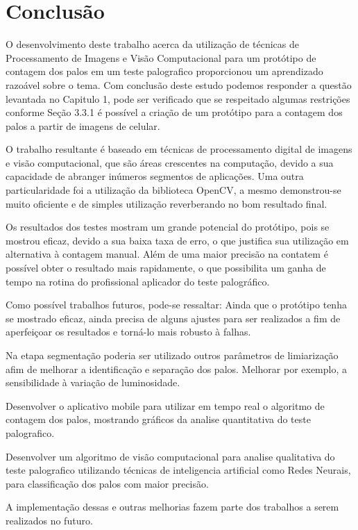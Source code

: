  \chapter{Conclusão}
\label{cap:conclu}

O desenvolvimento deste trabalho acerca da utilização de técnicas de Processamento de Imagens e Visão Computacional para um protótipo de contagem dos palos em um teste palografico proporcionou um aprendizado razoável sobre o tema.  Com conclusão deste estudo podemos responder a questão levantada no Capitulo 1, pode ser verificado que se respeitado algumas restrições conforme Seção 3.3.1 é possível a criação de um protótipo para a contagem dos palos a partir de imagens de celular.

O trabalho resultante é baseado em técnicas de processamento digital de imagens e visão computacional, que são áreas crescentes na computação, devido a sua capacidade de abranger inúmeros segmentos de aplicações. Uma outra particularidade foi a utilização da biblioteca OpenCV, a mesmo demonstrou-se muito oficiente e de simples utilização reverberando no bom resultado final.

Os resultados dos testes mostram um grande potencial do protótipo, pois se mostrou eficaz, devido a sua baixa taxa de erro, o que justifica sua utilização em alternativa à contagem manual.  Além de uma maior precisão na contatem é possível obter o resultado mais rapidamente, o que possibilita um ganha de tempo na rotina do profissional aplicador do teste palográfico.

Como possível trabalhos futuros, pode-se ressaltar:
Ainda que o protótipo tenha se mostrado eficaz, ainda precisa de alguns ajustes para ser realizados a fim de aperfeiçoar os resultados e torná-lo mais robusto à falhas.

Na etapa segmentação poderia ser utilizado outros parâmetros de limiarização afim de melhorar a identificação e separação dos palos. Melhorar por exemplo, a sensibilidade à variação de luminosidade.

Desenvolver o aplicativo mobile para utilizar em tempo real o algoritmo de contagem dos palos, mostrando gráficos da analise quantitativa do teste palografico.

Desenvolver um algoritmo de visão computacional para analise qualitativa do teste palografico utilizando técnicas de inteligencia artificial como Redes Neurais, para classificação dos palos com maior precisão.

A implementação dessas e outras melhorias fazem parte dos trabalhos a serem realizados no futuro.








